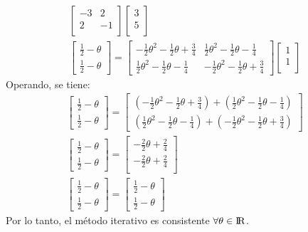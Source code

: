 \begin{itemize}
\begin{gather*}
\begin{bmatrix}
       -3   &     2 \\
        2   &    -1 \\
	\end{bmatrix}
    \begin{bmatrix}
      3 \\
      5 \\
	\end{bmatrix}
    \\
    \begin{bmatrix}
    	\frac{1}{2} -\theta \\
    	\frac{1}{2} -\theta 
	\end{bmatrix} = 
   	\begin{bmatrix}
       -\frac{1}{2}\theta^2 - \frac{1}{2}\theta + \frac{3}{4} & \frac{1}{2}\theta^2 - \frac{1}{2}\theta - \frac{1}{4} \\
       \frac{1}{2}\theta^2 - \frac{1}{2}\theta - \frac{1}{4} & -\frac{1}{2}\theta^2 - \frac{1}{2}\theta + \frac{3}{4}
	\end{bmatrix}
    \begin{bmatrix}
      1 \\
      1 \\
	\end{bmatrix}
\end{gather*}
Operando, se tiene:
\begin{gather*}
	\begin{bmatrix}
    	\frac{1}{2} -\theta \\
    	\frac{1}{2} -\theta 
	\end{bmatrix} = 
   	\begin{bmatrix}
       (-\frac{1}{2}\theta^2 - \frac{1}{2}\theta + \frac{3}{4}) + (\frac{1}{2}\theta^2 - \frac{1}{2}\theta - \frac{1}{4})\\
       (\frac{1}{2}\theta^2 - \frac{1}{2}\theta - \frac{1}{4}) + (-\frac{1}{2}\theta^2 - \frac{1}{2}\theta + \frac{3}{4})
	\end{bmatrix}\\
	\begin{bmatrix}
    	\frac{1}{2} -\theta \\
    	\frac{1}{2} -\theta 
	\end{bmatrix} = 
	\begin{bmatrix}
       -\frac{2}{2}\theta + \frac{2}{4}\\
       -\frac{2}{2}\theta + \frac{2}{4}\\
	\end{bmatrix}\\
	\begin{bmatrix}
    	\frac{1}{2} -\theta \\
    	\frac{1}{2} -\theta 
	\end{bmatrix} = 
	\begin{bmatrix}
    	\frac{1}{2} -\theta \\
    	\frac{1}{2} -\theta 
	\end{bmatrix}
\end{gather*}
Por lo tanto, el método iterativo es consistente $\forall\theta\in {\rm I\!R}$.\\\\



\end{itemize}
